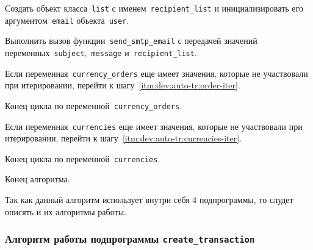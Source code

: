 \begin{enumerate_step}
    \item Создать объект класса~\lstinline{list} с именем~\lstinline{recipient_list} и
    инициализировать его аргументом~\lstinline{email} объекта~\lstinline{user}.
    \item Выполнить вызов функции~\lstinline{send_smtp_email} с передачей значений
    переменных~\lstinline{subject},~\lstinline{message} и~\lstinline{recipient_list}.

    \item Если переменная~\lstinline{currency_orders} еще имеет значения,
    которые не участвовали при итерировании, перейти к шагу~\ref{itm:dev:auto-tr:order-iter}.
    \item Конец цикла по переменной~\lstinline{currency_orders}.

    \item Если переменная~\lstinline{currencies} еще имеет значения,
    которые не участвовали при итерировании, перейти к шагу~\ref{itm:dev:auto-tr:currencies-iter}.
    \item Конец цикла по переменной~\lstinline{currencies}.

    \item Конец алгоритма.
\end{enumerate_step}

Так как данный алгоритм использует внутри себя 4 подпрограммы, то слудет описять и их алгоритмы работы.

\subsubsection{Алгоритм работы подпрограммы \lstinline{create_transaction}}

